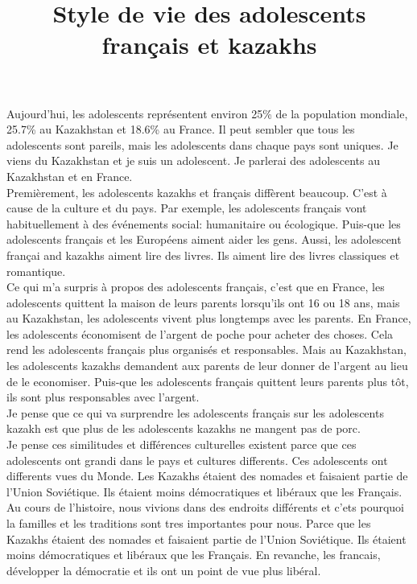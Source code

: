 \documentclass[a4paper, 12pt]{article}
\title{Style de vie des adolescents français et kazakhs}
\author{}
\date{}
\begin{document}
\maketitle
{}
\section{}

Aujourd'hui, les adolescents représentent environ 25\% \cite{teenagers} de la population mondiale, 25.7\% au Kazakhstan et 18.6\% au France. Il peut sembler que tous les adolescents sont pareils, mais les adolescents dans chaque pays sont uniques. Je viens du Kazakhstan et je suis un adolescent. Je parlerai des adolescents au Kazakhstan et en France. \\

Premièrement, les adolescents kazakhs et français diffèrent beaucoup.
C'est à cause de la culture et du pays.
Par exemple, les adolescents français vont habituellement à des événements social: humanitaire ou écologique.
Puis-que les adolescents français et les Européens aiment aider les gens.
Aussi, les adolescent françai and kazakhs aiment lire des livres. \cite{hobbies}
Ils aiment lire des livres classiques et romantique.\\

Ce qui m'a surpris à propos des adolescents français, c'est que en France, les adolescents quittent la maison de leurs parents lorsqu'ils ont 16 ou 18 ans, mais au Kazakhstan, les adolescents vivent plus longtemps avec les parents.
En France, les adolescents économisent de l'argent de poche pour acheter des choses.
Cela rend les adolescents français plus organisés et responsables.
Mais au Kazakhstan, les adolescents kazakhs demandent aux parents de leur donner de l'argent au lieu de le economiser.
Puis-que les adolescents français quittent leurs parents plus tôt, ils sont plus responsables avec l'argent.\\

Je pense que ce qui va surprendre les adolescents français sur les adolescents kazakh est que plus de les adolescents kazakhs ne mangent pas de porc.\\

Je pense ces similitudes et différences culturelles existent parce que ces adolescents ont grandi dans le pays et cultures differents.
Ces adolescents ont differents vues du Monde.
Les Kazakhs étaient des nomades et faisaient partie de l'Union Soviétique.
Ils étaient moins démocratiques et libéraux que les Français.
Au cours de l'histoire, nous vivions dans des endroits différents et c'ets pourquoi la familles et les traditions sont tres importantes pour nous.
Parce que les Kazakhs étaient des nomades et faisaient partie de l'Union Soviétique.
Ils étaient moins démocratiques et libéraux que les Français.
En revanche, les francais, développer la démocratie et ils ont un point de vue plus libéral.\\
\end{document}
